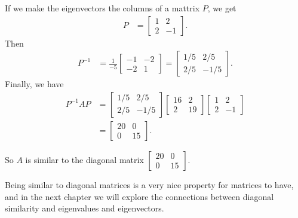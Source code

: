 \documentclass{ximera}
\begin{document}
\begin{example}
\begin{explanation}
If we make the eigenvectors the columns of a mattrix $P$, we get
\begin{align*}
P &= \begin{bmatrix}
1 & 2\\2& -1
\end{bmatrix}.
\end{align*}
Then
\begin{align*}
P^{-1} &= \frac{1}{-5}\begin{bmatrix}
-1 & -2\\-2& 1
\end{bmatrix} = \begin{bmatrix}
1/5 & 2/5\\2/5& -1/5
\end{bmatrix}.
\end{align*}
Finally, we have
\begin{align*}
P^{-1}AP &= \begin{bmatrix}
1/5 & 2/5\\2/5& -1/5
\end{bmatrix}\begin{bmatrix}
16 & 2\\2& 19
\end{bmatrix}\begin{bmatrix}
1 & 2\\2& -1
\end{bmatrix}\\
&= \begin{bmatrix}
20 & 0\\0& 15
\end{bmatrix}.
\end{align*}

So $A$ is similar to the diagonal matrix $\begin{bmatrix}
20 & 0\\0& 15
\end{bmatrix}$.


\end{explanation}
\end{example}


Being similar to diagonal matrices is a very nice property for matrices to have, and in the next chapter we will explore the connections between diagonal similarity and eigenvalues and eigenvectors.
\end{document}

